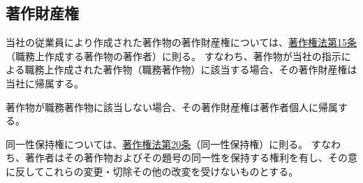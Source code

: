 \subsection{著作財産権}
当社の従業員により作成された著作物の著作財産権については、\href{https://elaws.e-gov.go.jp/document?lawid=345AC0000000048#Mp-At_15}{著作権法第15条}（職務上作成する著作物の著作者）\cite{online:eGovCopyrightLaw}に則る。
すなわち、著作物が当社の指示による職務上作成された著作物（職務著作物）に該当する場合、その著作財産権は当社に帰属する。

著作物が職務著作物に該当しない場合、その著作財産権は著作者個人に帰属する。



同一性保持権については、\href{https://elaws.e-gov.go.jp/document?lawid=345AC0000000048\#Mp-At_20}{著作権法第20条}（同一性保持権）に則る。
すなわち、著作者はその著作物およびその題号の同一性を保持する権利を有し、その意に反してこれらの変更・切除その他の改変を受けないものとする。



